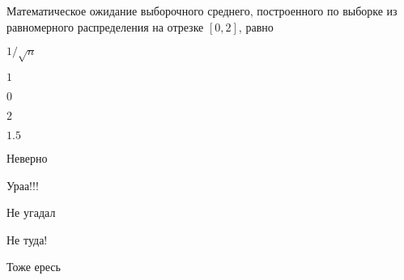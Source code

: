 
\begin{question}
Математическое ожидание выборочного среднего, построенного по выборке из
равномерного распределения на отрезке \([0,2]\), равно
\begin{answerlist}
  \item \(1/\sqrt{n}\)
  \item \(1\)
  \item \(0\)
  \item \(2\)
  \item \(1.5\)
\end{answerlist}
\end{question}

\begin{solution}
\begin{answerlist}
  \item Неверно
  \item Ураа!!!
  \item Не угадал
  \item Не туда!
  \item Тоже ересь
\end{answerlist}
\end{solution}

